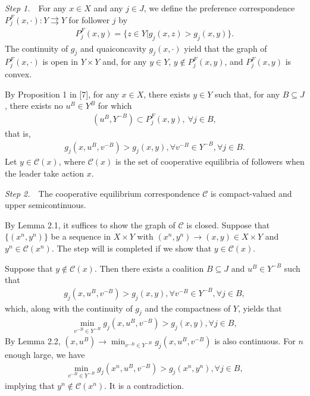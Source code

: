 {\it Step 1.}~~For any $x\in X$ and any $j\in J$, we define the preference
correspondence $P^F_j(x,\cdot):Y\rightrightarrows Y$ for follower $j$
by
\begin{eqnarray*}
P^F_j(x,y)=\{z\in Y|g_j(x,z)>g_j(x,y)\}.
\end{eqnarray*}
The continuity of $g_j$ and quaiconcavity $g_j(x,\cdot)$ yield that the graph of
$P^F_j(x,\cdot)$ is open in $Y\times Y$ and, for any $y\in Y$, $y\not\in P^F_j(x,y)$, and
$P^F_j(x,y)$ is convex.

By Proposition 1 in [7], for any $x\in X$, there exists $y\in Y$ such that, for any $B\subseteq J$,
there exists no $u^B\in Y^B$ for which
\begin{eqnarray*}
(u^B,Y^{-B})\subset P^F_j(x,y),\ \forall j\in B,
\end{eqnarray*}
that is,
\begin{eqnarray*}
g_j(x,u^B,v^{-B})>g_j(x,y),\forall v^{-B}\in Y^{-B},\forall j\in B.
\end{eqnarray*}
Let $y\in \mathcal{C}(x)$, where
$\mathcal{C}(x)$ is the set of
cooperative equilibria of followers when the leader take action $x$.


{\it Step 2.}~~The cooperative equilibrium correspondence $\mathcal{C}$ is
compact-valued and upper semicontinuous.

By Lemma 2.1, it suffices to show the graph of $\mathcal{C}$
is closed. Suppose that $\{(x^n,y^n)\}$ be a sequence in $X\times Y$ with
$(x^n,y^n)\longrightarrow (x,y)\in X\times Y$ and $y^n\in \mathcal{C}(x^n)$.
The step will is completed if we show that $y\in \mathcal{C}(x)$.

Suppose that $y\not\in \mathcal{C}(x)$. Then there exists a coalition $B\subseteq J$
and $u^B\in Y^{-B}$ such that
\begin{eqnarray*}
g_j(x,u^B,v^{-B})>g_j(x,y),\forall v^{-B}\in Y^{-B},\forall j\in B,
\end{eqnarray*}
which, along with the continuity of $g_j$ and the compactness of $Y$, yields that
\begin{eqnarray*}
\min_{v^{-B}\in Y^{-B}}g_j(x,u^B,v^{-B})>g_j(x,y),\forall j\in B,
\end{eqnarray*}
By Lemma 2.2, $(x,u^B)\longrightarrow \min_{v^{-B}\in Y^{-B}}g_j(x,u^B,v^{-B})$
is also continuous. For $n$ enough large, we have
\begin{eqnarray*}
\min_{v^{-B}\in Y^{-B}}g_j(x^n,u^B,v^{-B})>g_j(x^n,y^n),\forall j\in B,
\end{eqnarray*}
implying that $y^n\not\in \mathcal{C}(x^n)$. It is a contradiction.


